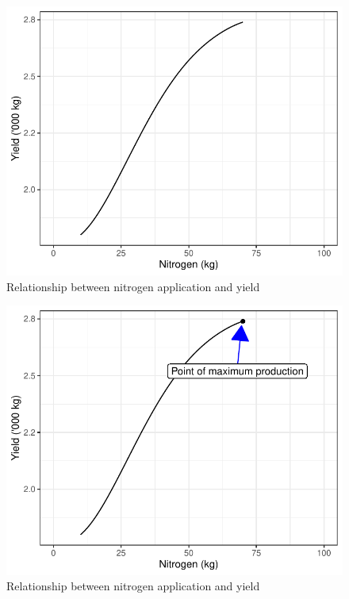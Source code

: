 \documentclass[12pt,ignorenonframetext,aspectratio=169]{beamer}
\begin{document}
\begin{frame}{}
\protect\hypertarget{section-1}{}
\begin{figure}
\includegraphics[width=0.5\linewidth]{production_relationship_files/figure-beamer/nitrogen-wheat-1} \caption{Relationship between nitrogen application and yield}\label{fig:nitrogen-wheat}
\end{figure}
\end{frame}

\begin{frame}{}
\protect\hypertarget{section-2}{}
\begin{figure}
\includegraphics[width=0.5\linewidth]{production_relationship_files/figure-beamer/nitrogen-wheat-optimum-production-1} \caption{Relationship between nitrogen application and yield}\label{fig:nitrogen-wheat-optimum-production}
\end{figure}
\end{frame}
\end{document}
